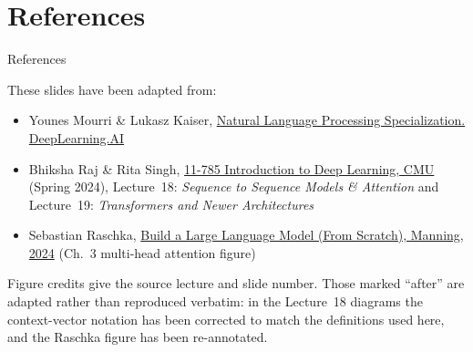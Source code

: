 \section{References}
\begin{frame}{References}
  \begin{flushleft}
    These slides have been adapted from:
    \begin{itemize}
      \item[$\blacktriangleright$] Younes Mourri \& Lukasz Kaiser, 
        \href{https://www.deeplearning.ai/courses/natural-language-processing-specialization/}{Natural Language Processing Specialization. DeepLearning.AI}
      \item[$\blacktriangleright$] Bhiksha Raj \& Rita Singh,
        \href{https://deeplearning.cs.cmu.edu/}{11-785 Introduction to Deep Learning, CMU} (Spring 2024), Lecture~18: \textit{Sequence to Sequence Models \& Attention} and Lecture~19: \textit{Transformers and Newer Architectures}
      \item[$\blacktriangleright$] Sebastian Raschka,
        \href{https://github.com/rasbt/LLMs-from-scratch}{Build a Large Language Model (From Scratch), Manning, 2024} (Ch.~3 multi-head attention figure)
    \end{itemize}
    \vspace{1em}
    {\footnotesize Figure credits give the source lecture and slide number. Those marked ``after'' are adapted rather than reproduced verbatim: in the Lecture~18 diagrams the context-vector notation has been corrected to match the definitions used here, and the Raschka figure has been re-annotated.}
  \end{flushleft}
\end{frame}

